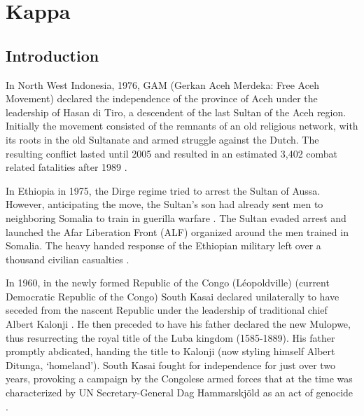 \chapter{Kappa}
\section{Introduction}


In North West Indonesia, 1976, GAM (Gerkan Aceh Merdeka: Free Aceh Movement)
declared the independence of the province of Aceh under the leadership of Hasan
di Tiro, a descendent of the last Sultan of the Aceh region. Initially the
movement consisted of the remnants of an old religious network, with its roots
in the old Sultanate and armed struggle against the Dutch. The resulting
conflict lasted until 2005 and resulted in an estimated 3,402 combat related
fatalities after 1989 \citep{Aspinall2009, Pettersson2018, Sundberg2013}.

In Ethiopia in 1975, the Dirge regime tried to arrest the Sultan of Aussa. However,
anticipating the move, the Sultan's son had already sent men to neighboring
Somalia to train in guerilla warfare \citep{Shehim1985}. The Sultan evaded
arrest and launched the Afar Liberation Front (ALF) organized around the men
trained in Somalia. The heavy handed response of the Ethiopian military left
over a thousand civilian casualties \citep{UCDPconflict363}.

In 1960, in the newly formed Republic of the Congo (Léopoldville) (current
Democratic Republic of the Congo) South Kasai declared unilaterally to have
seceded from the nascent Republic under the leadership of traditional chief
Albert Kalonji \citep{Nzongola2002}. He then preceded to have his father
declared the new Mulopwe, thus resurrecting the royal title of the Luba kingdom
(1585-1889). His father promptly abdicated, handing the title to Kalonji (now
styling himself Albert Ditunga, `homeland'). South Kasai fought for independence
for just over two years, provoking a campaign by the Congolese armed forces that
at the time was characterized by UN Secretary-General Dag Hammarskjöld as an act
of genocide \citep{Nzongola2002}.

